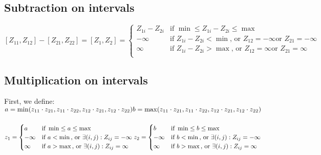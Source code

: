 \subsection{Subtraction on intervals}
$[Z_{11},Z_{12}] - [Z_{21},Z_{22}] = [Z_{1},Z_{2}] =
     \begin{cases} 
        Z_{1i} - Z_{2i} & \text{if } \min \leq Z_{1i} - Z_{2i} \leq \max \\
        -\infty         & \text{if } Z_{1i} - Z_{2i} < \min \text{, or } Z_12 = -\infty  \text{or } Z_21 = -\infty\\
        \infty          & \text{if } Z_{1i} - Z_{2i} > \max \text{, or } Z_12 = \infty  \text{or } Z_21 = \infty\\
     \end{cases}
$

\subsection{Multiplication on intervals}
First, we define:\\
$
a = \min(z_{11} \cdot z_{21}, z_{11} \cdot z_{22}, z_{12} \cdot z_{21}, z_{12} \cdot z_{22})\\
b = \max(z_{11} \cdot z_{21}, z_{11} \cdot z_{22}, z_{12} \cdot z_{21}, z_{12} \cdot z_{22})\\
$\\\\
$z_1 =
     \begin{cases} 
        a       & \text{if } \min \leq a \leq \max \\
        -\infty & \text{if } a < \min \text{, or } \exists (i,j) : {Z_{ij} = -\infty} \\
        \infty & \text{if } a > \max \text{, or } \exists (i,j) : {Z_{ij} = \infty} \\
     \end{cases}\\
z_2 =
     \begin{cases} 
        b       & \text{if } \min \leq b \leq \max \\
        -\infty & \text{if } b < \min \text{, or } \exists (i,j) : {Z_{ij} = -\infty} \\
        \infty & \text{if } b > \max \text{, or } \exists (i,j) : {Z_{ij} = \infty} \\
     \end{cases}
$
